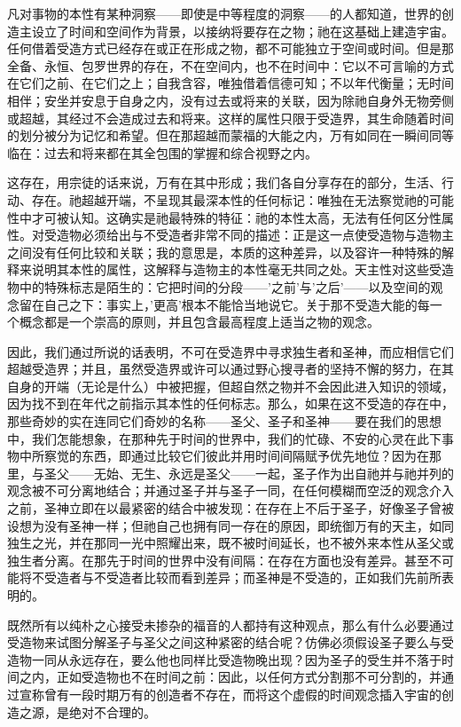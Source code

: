 凡对事物的本性有某种洞察——即使是中等程度的洞察——的人都知道，世界的创造主设立了时间和空间作为背景，以接纳将要存在之物；祂在这基础上建造宇宙。任何借着受造方式已经存在或正在形成之物，都不可能独立于空间或时间。但是那全备、永恒、包罗世界的存在，不在空间内，也不在时间中：它以不可言喻的方式在它们之前、在它们之上；自我含容，唯独借着信德可知；不以年代衡量；无时间相伴；安坐并安息于自身之内，没有过去或将来的关联，因为除祂自身外无物旁侧或超越，其经过不会造成过去和将来。这样的属性只限于受造界，其生命随着时间的划分被分为记忆和希望。但在那超越而蒙福的大能之内，万有如同在一瞬间同等临在：过去和将来都在其全包围的掌握和综合视野之内。\par

这存在，用宗徒的话来说，万有在其中形成；我们各自分享存在的部分，生活、行动、存在。祂超越开端，不呈现其最深本性的任何标记：唯独在无法察觉祂的可能性中才可被认知。这确实是祂最特殊的特征：祂的本性太高，无法有任何区分性属性。对受造物必须给出与不受造者非常不同的描述：正是这一点使受造物与造物主之间没有任何比较和关联；我的意思是，本质的这种差异，以及容许一种特殊的解释来说明其本性的属性，这解释与造物主的本性毫无共同之处。天主性对这些受造物中的特殊标志是陌生的：它把时间的分段——'之前'与'之后'——以及空间的观念留在自己之下：事实上，'更高'根本不能恰当地说它。关于那不受造大能的每一个概念都是一个崇高的原则，并且包含最高程度上适当之物的观念。\par

因此，我们通过所说的话表明，不可在受造界中寻求独生者和圣神，而应相信它们超越受造界；并且，虽然受造界或许可以通过野心搜寻者的坚持不懈的努力，在其自身的开端（无论是什么）中被把握，但超自然之物并不会因此进入知识的领域，因为找不到在年代之前指示其本性的任何标志。那么，如果在这不受造的存在中，那些奇妙的实在连同它们奇妙的名称——圣父、圣子和圣神——要在我们的思想中，我们怎能想象，在那种先于时间的世界中，我们的忙碌、不安的心灵在此下事物中所察觉的东西，即通过比较它们彼此并用时间间隔赋予优先地位？因为在那里，与圣父——无始、无生、永远是圣父——一起，圣子作为出自祂并与祂并列的观念被不可分离地结合；并通过圣子并与圣子一同，在任何模糊而空泛的观念介入之前，圣神立即在以最紧密的结合中被发现：在存在上不后于圣子，好像圣子曾被设想为没有圣神一样；但祂自己也拥有同一存在的原因，即统御万有的天主，如同独生之光，并在那同一光中照耀出来，既不被时间延长，也不被外来本性从圣父或独生者分离。在那先于时间的世界中没有间隔：在存在方面也没有差异。甚至不可能将不受造者与不受造者比较而看到差异；而圣神是不受造的，正如我们先前所表明的。\par

既然所有以纯朴之心接受未掺杂的福音的人都持有这种观点，那么有什么必要通过受造物来试图分解圣子与圣父之间这种紧密的结合呢？仿佛必须假设圣子要么与受造物一同从永远存在，要么他也同样比受造物晚出现？因为圣子的受生并不落于时间之内，正如受造物也不在时间之前：因此，以任何方式分割那不可分割的，并通过宣称曾有一段时期万有的创造者不存在，而将这个虚假的时间观念插入宇宙的创造之源，是绝对不合理的。\par

